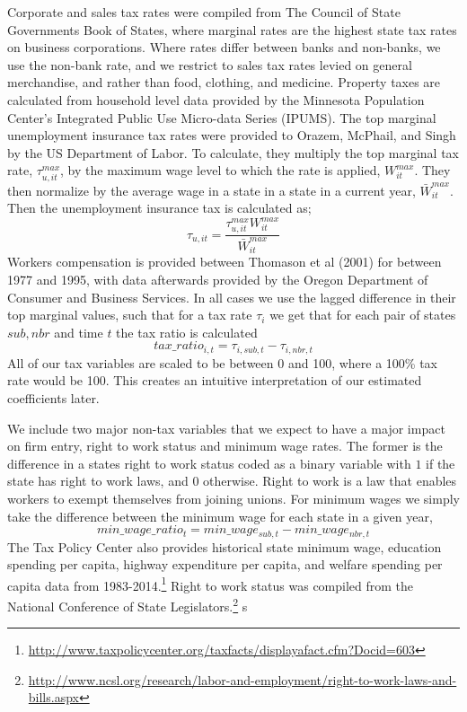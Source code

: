Corporate and sales tax rates were compiled from The Council of State Governments Book of States, where marginal rates are the highest state tax rates on business corporations. Where rates differ between banks and non-banks, we use the non-bank rate, and we restrict to sales tax rates levied on general merchandise, and rather than food, clothing, and medicine. Property taxes are calculated from household level data provided by the Minnesota Population Center's Integrated Public Use Micro-data Series (IPUMS). The top marginal unemployment insurance tax rates were provided to Orazem, McPhail, and Singh by the US Department of Labor. To calculate, they multiply the top marginal tax rate, $\tau_{u,it}^{max}$, by the maximum wage level to which the rate is applied, $W_{it}^{max}$. They then normalize by the average wage in a state in a state in a current year, $\bar W_{it}^{max}$. Then the unemployment insurance tax is calculated as;
\begin{equation} \tau_{u,it} = \frac{\tau_{u,it}^{max}W_{it}^{max}}{\bar W_{it}^{max}}\end{equation}
Workers compensation is provided between Thomason et al (2001) for between 1977 and 1995, with data afterwards provided by the Oregon Department of Consumer and Business Services. In all cases we use the lagged difference in their top marginal values, such that for a tax rate $\tau_{i}$ we get that for each pair of states $sub, nbr$ and time $t$ the tax ratio is calculated 
$$tax\_ratio_{i,t} = \tau_{i,sub,t}-\tau_{i,nbr,t}$$
All of our tax variables are scaled to be between 0 and 100, where a 100\% tax rate would be 100. This creates an intuitive interpretation of our estimated coefficients later.

We include two major non-tax variables that we expect to have a major impact on firm entry, right to work status and minimum wage rates. The former is the difference in a states right to work status coded as a binary variable with $1$ if the state has right to work laws, and $0$ otherwise. Right to work is a law that enables workers to exempt themselves from joining unions. For minimum wages we simply take the difference between the minimum wage for each state in a given year, 
$$min\_wage\_ratio_{t} = min\_wage_{sub,t} - min\_wage_{nbr,t}$$
The Tax Policy Center also provides historical state minimum wage, education spending per capita, highway expenditure per capita, and welfare spending per capita data from 1983-2014.\footnote{\url{http://www.taxpolicycenter.org/taxfacts/displayafact.cfm?Docid=603}} Right to work status was compiled from the National Conference of State Legislators.\footnote{\url{http://www.ncsl.org/research/labor-and-employment/right-to-work-laws-and-bills.aspx}} s

